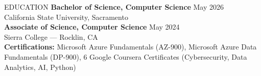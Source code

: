 \documentclass{resume}
\begin{document}
\begin{rSection}{EDUCATION}
\textbf{Bachelor of Science, Computer Science} \hfill May 2026 \\
California State University, Sacramento \\

\textbf{Associate of Science, Computer Science} \hfill May 2024 \\
Sierra College --- Rocklin, CA \\

\textbf{Certifications:} Microsoft Azure Fundamentals (AZ-900), Microsoft Azure Data Fundamentals (DP-900), 6 Google Coursera Certificates (Cybersecurity, Data Analytics, AI, Python)
\end{rSection}
\end{document}
